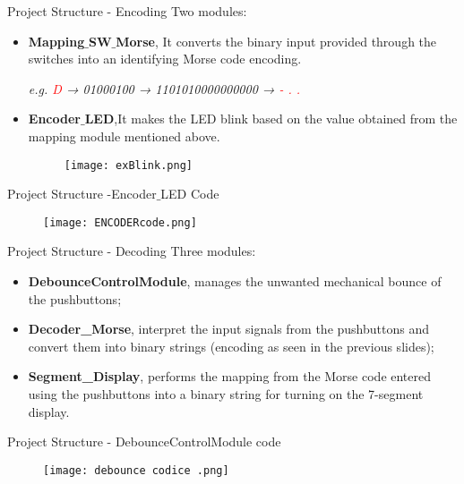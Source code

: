 \documentclass[9pt]{beamer}
\begin{document}
\begin{frame}{Project Structure - Encoding }
Two modules:
\begin{itemize}
    \item \textbf{Mapping$\_$SW$\_$Morse}, It converts the binary input provided through the switches into an identifying Morse code encoding.
    \begin{center}
        \emph{e.g. \textcolor{red}{D} → 01000100 → 1101010000000000 →   \textcolor{red}{- . .}}
    \end{center}
    
    \item \textbf{Encoder$\_$LED},It makes the LED blink based on the value obtained from the mapping module mentioned above.
    \begin{figure}
           \centering
           
           \texttt{[image: exBlink.png]}
    \end{figure}
\end{itemize}


\end{frame}

\begin{frame}{Project Structure -Encoder$\_$LED Code}
    \begin{figure}
           \centering
           
           \texttt{[image: ENCODERcode.png]}
    \end{figure}
\end{frame}

\begin{frame}{Project Structure - Decoding}
    Three modules:
    \begin{itemize}
        \item \textbf{DebounceControlModule}, manages the unwanted mechanical bounce of the pushbuttons;
        \item \textbf{Decoder\_Morse}, interpret the input signals from the pushbuttons and convert them into binary strings (encoding as seen in the previous slides);
        \item \textbf{Segment\_Display}, performs the mapping from the Morse code entered using the pushbuttons into a binary string for turning on the 7-segment display.
    \end{itemize}
\end{frame}



\begin{frame}{Project Structure -  DebounceControlModule code}
    \begin{figure}
           \centering
           
           \texttt{[image: debounce codice .png]}
    \end{figure}
\end{frame}
\end{document}
